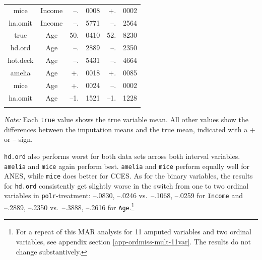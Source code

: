 \documentclass[12pt,econ]{sources/authesis}
\begin{document}
\begin{table}[!htbp]
\begin{threeparttable}
\begin{tabular}{ccr@{}lr@{}l}
 mice & Income & --.&0008 & +.&0002 \\
 ha.omit & Income & --.&5771 & --.&2564 \\
 true & Age & 50.&0410 & 52.&8230 \\
 hd.ord & Age & --.&2889 & --.&2350 \\
 hot.deck & Age & --.&5431 & --.&4664 \\
 amelia & Age & +.&0018 & +.&0085 \\
 mice & Age & +.&0024 & --.&0002 \\ 
 ha.omit & Age & --1.&1521 & --1.&1228 \\
 \hline \\[-1.8ex] 
\end{tabular} 
\begin{tablenotes}
\footnotesize{\textit{Note:} Each \texttt{true} value shows the true variable mean. All other values show the differences between the imputation means and the true mean, indicated with a + or -- sign.}
\end{tablenotes}
\end{threeparttable}
\end{table}
\texttt{hd.ord} also performs worst for both data sets across both interval variables. \texttt{amelia} and \texttt{mice} again perform best. \texttt{amelia} and \texttt{mice} perform equally well for ANES, while \texttt{mice} does better for CCES. As for the binary variables, the results for \texttt{hd.ord} consistently get slightly worse in the switch from one to two ordinal variables in \texttt{polr}-treatment: --.0830, --.0246 vs.~--.1068, --.0259 for \texttt{Income} and --.2889, --.2350 vs.~--.3888, --.2616 for \texttt{Age}.\footnote{For a repeat of this MAR analysis for 11 amputed variables and two ordinal variables, see appendix section \ref{app-ordmiss-mult-11var}. The results do not change substantively.}
\end{document}
